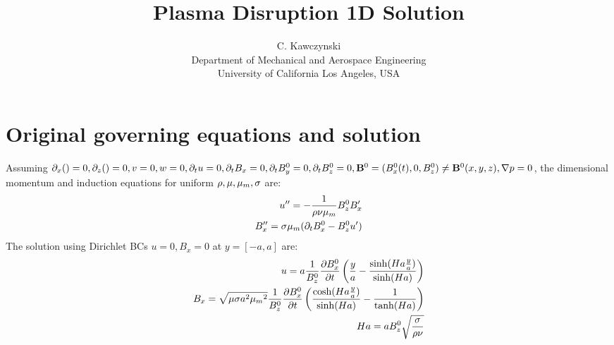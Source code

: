 \documentclass[11pt]{article}
\begin{document}
\doublespacing
\title{Plasma Disruption 1D Solution}
\author{C. Kawczynski \\
Department of Mechanical and Aerospace Engineering \\
University of California Los Angeles, USA\\
}
\maketitle

\section{Original governing equations and solution}
Assuming $\partial_x () =0, \partial_z () = 0, v=0,w=0, \partial_t u = 0, \partial_t B_x = 0,\partial_t B_y^0 = 0, \partial_t B_z^0 = 0,\mathbf{B}^0 = (B_x^0(t),0,B_z^0) \ne \mathbf{B}^0(x,y,z), \nabla p =0$, the dimensional momentum and induction equations for uniform $\rho,\mu,{\mu_m},\sigma$ are:
\begin{equation}\begin{aligned}
u''   = - \frac{1}{\rho \nu {\mu_m}} B_z^0 B_x' \\
B_x'' = \sigma {\mu_m} (\partial_t B_x^0 - B_z^0 u') \\
\end{aligned} \end{equation}
\noindent
The solution using Dirichlet BCs $u=0,B_x = 0$ at $y=[-a,a]$ are:
\begin{equation}\begin{aligned}
u   = a \frac{1}{B_z^0} \frac{\partial B_x^0}{\partial t} \left( \frac{y}{a} - \frac{\sinh(Ha \frac{y}{a})}{\sinh(Ha)} \right) \\
B_x = \sqrt{\mu \sigma a^2 {\mu_m}^2} \frac{1}{B_z^0} \frac{\partial B_x^0}{\partial t} \left( \frac{\cosh(Ha \frac{y}{a})}{\sinh(Ha)} - \frac{1}{\tanh(Ha)} \right) \\
Ha = a B_z^0 \sqrt{\frac{\sigma}{\rho \nu}} \\
\end{aligned} \end{equation}
\end{document}
